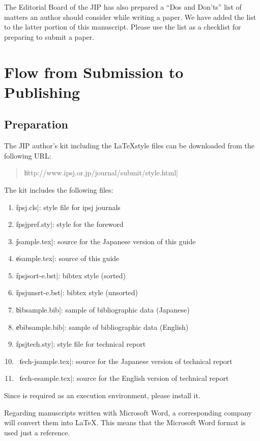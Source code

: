 \documentclass[english,preprint,JIP]{ipsj}
\begin{document}
The Editorial Board of the JIP has also prepared a ``Dos and Don'ts''
list of matters an author should consider while writing a paper.  We
have added the list to the latter portion of this manuscript.  Please
use the list as a checklist for preparing to submit a paper.

\section{Flow from Submission to Publishing}
\subsection{Preparation}

The JIP author's kit including the \LaTeX style files can be downloaded
from the following URL:
\begin{quote}
 \small
 \|http://www.ipsj.or.jp/journal/submit/style.html|
\end{quote}
The kit includes the following files:
\begin{enumerate}
\item \|ipsj.cls|: style file for ipsj journals
\item \|ipsjpref.sty|: style for the foreword
\item \|jsample.tex|: source for the Japanese version of this guide
\item \|esample.tex|: source of this guide
\item \|ipsjsort-e.bst|: bibtex style (sorted)
\item \|ipsjunsrt-e.bst|: bibtex style (unsorted)
\item \|bibsample.bib|: sample of bibliographic data (Japanese)
\item \|ebibsample.bib|: sample of bibliographic data (English)

\item \|ipsjtech.sty|: style file for technical report
\item \ \|tech-jsample.tex|: source for the Japanese version of technical report
\item \ \|tech-esample.tex|: source for the English version of technical report
\end{enumerate}



Since {\LaTeXe} is required as an execution environment, please install
it.

Regarding manuscripts written with Microsoft Word, a corresponding
company will convert them into \LaTeX\@.  This means that the Microsoft
Word format is used just a reference.
\end{document}
